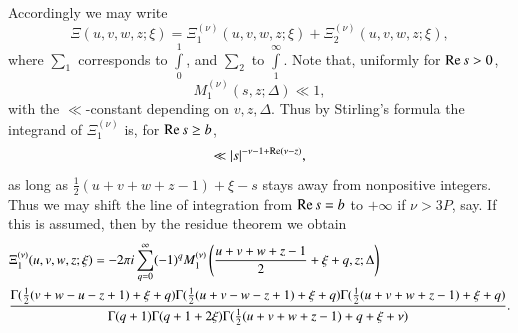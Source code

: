Accordingly we may write 
\begin{equation}
\Xi (u,v,w,z;\xi) = \Xi^{(\nu)}_1(u,v,w,z;\xi) + \Xi^{(\nu)}_2 (u,v,w,z;\xi),
\label{c5:eq5.97} 
\end{equation}
where $\sum_1$ corresponds to $\int\limits^1_0$, and $\sum_2$ to
$\int\limits^\infty_1$. Note that, uniformly for $\operatorname{Re} s >
0$,\pageoriginale 
$$
M^{(\nu)}_1 (s, z;\Delta) \ll 1, 
$$
with the $\ll$-constant depending on $v,z,\Delta$. Thus by Stirling's
formula the integrand of $\Xi^{(\nu)}_1$ is, for $\operatorname{Re} s \geq b$, 
$$
\ll |s|^{-\nu - 1+ \operatorname{Re} (\nu-z)},
$$
as long as $\frac{1}{2}(u+v+w+z-1) + \xi -s$ stays away from
nonpositive integers. Thus we may shift the line of integration from
$\operatorname{Re} s =b$ to $+ \infty$ if $\nu > 3P$, say. If this is assumed, then
by the residue theorem we obtain 
{\fontsize{8}{10}\selectfont
\begin{align}
& \Xi^{(\nu)}_1 (u,v,w,z;\xi) = 
-2\pi i \sum\limits^\infty_{q=0} (-1)^q M^{(\nu)}_1
\left(\frac{u+v+w+z-1}{2} + \xi + q, z ;\Delta \right)\notag\\ 
& \frac{\Gamma (\frac{1}{2} (v+w-u-z+1) + \xi + q) \Gamma (\frac{1}{2}
  (u+v-w-z+1) + \xi + q) \Gamma (\frac{1}{2} (u+v+w+z-1) + \xi +
  q)}{\Gamma(q+1)\Gamma (q+1+2\xi) \Gamma (\frac{1}{2} (u+v+w+z-1) + q
  + \xi + \nu)}.\label{c5:eq5.98} 
\end{align}}

